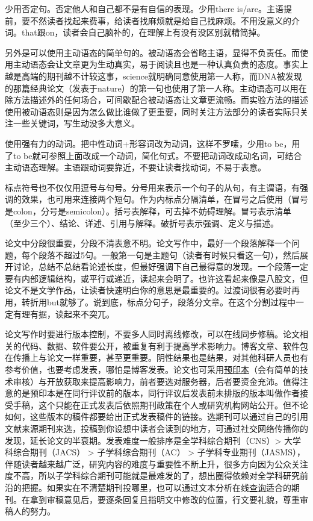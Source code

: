 \documentclass[]{tufte-book}
\begin{document}
少用否定句。否定他人和自己都不是有自信的表现。少用there is/are。主语提前，要不然读者找起来费事，给读者找麻烦就是给自己找麻烦。不用没意义的介词。that跟on，读者会自己脑补的，在理解上有没有没区别就精简掉。

另外是可以使用主动语态的简单句的。被动语态会省略主语，显得不负责任。而使用主动语态会让文章更为生动真实，易于阅读且也是一种认真负责的态度。事实上越是高端的期刊越不计较这事，science就明确同意使用第一人称，而DNA被发现的那篇经典论文（发表于nature）的第一句也使用了第一人称。主动语态可以用在除方法描述外的任何场合，可间歇配合被动语态让文章更流畅。而实验方法的描述使用被动语态则是因为怎么做比谁做了更重要，同时关注方法部分的读者实际只关注一些关键词，写生动没多大意义。

使用强有力的动词。把中性动词+形容词改为动词，这样不罗嗦，少用to be，用了to be就可参照上面改成一个动词，简化句式。不要把动词改成动名词，可结合主动语态理解。主语跟动词要靠近，不要让读者找动词，不易于表意。

标点符号也不仅仅用逗号与句号。分号用来表示一个句子的从句，有主谓语，有强调的效果，也可用来连接两个短句。作为内标点分隔清单，在冒号之后使用（冒号是colon，分号是semicolon）。括号表解释，可去掉不妨碍理解。冒号表示清单（至少三个）、结论、详述、引用与解释。破折号表示强调、定义与描述。

论文中分段很重要，分段不清表意不明。论文写作中，最好一个段落解释一个问题，每个段落不超过5句。一般第一句是主题句（读者有时候只看这一句），然后展开讨论，总结不总结看论述长度，但最好强调下自己最得意的发现。一个段落一定要有内部逻辑结构，或平行或递近，读起来会明了。也许这看起来像是八股文，但论文不是文学作品，让读者快速明白你的意思是最重要的。过渡词很有必要时再用，转折用but就够了。说到底，标点分句子，段落分文章。在这个分割过程中一定有理有据，读起来不突兀。

论文写作时要进行版本控制，不要多人同时离线修改，可以在线同步修稿。论文相关的代码、数据、软件要公开，被重复有利于提高学术影响力。博客文章、软件包在传播上与论文一样重要，甚至更重要。阴性结果也是结果，对其他科研人员也有参考价值，也要考虑发表，哪怕是博客发表。论文也可采用\href{https://deevybee.blogspot.com/2018/06/preprint-publication-as-karaoke.html}{预印本}（会有简单的技术审核）与开放获取来提高影响力，前者要选对服务器，后者要资金充沛。值得注意的是预印本是在同行评议前的版本，同行评议后发表前未排版的版本叫做作者接受手稿，这个只能在正式发表后依照期刊政策在个人或研究机构网站公开。但不论如何，这些版本的稿件都要给出正式发表稿件的链接。选期刊可以通过自己的引用文献来源期刊来选，投稿到你设想中读者会读到的地方，可通过社交网络传播你的发现，延长论文的半衰期。发表难度一般排序是全学科综合期刊（CNS）\textgreater{} 大学科综合期刊（JACS） \textgreater{} 子学科综合期刊（AC） \textgreater{} 子学科专业期刊（JASMS），伴随读者越来越广泛，研究内容的难度与重要性不断上升，很多方向因为公众关注度不高，所以子学科综合期刊可能就是最难发的了，想出圈得依赖对全学科研究前沿的把握。如果实在不清楚期刊投哪里，也可以通过文本分析在线\href{https://jane.biosemantics.org/index.php}{查询}适合的期刊。在拿到审稿意见后，要逐条回复且指明文中修改的位置，行文要礼貌，尊重审稿人的努力。
\end{document}
